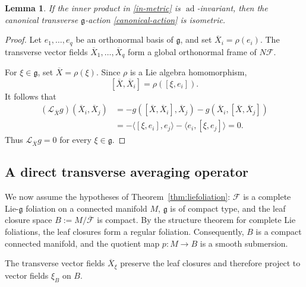\documentclass[reqno, 11pt]{amsart}
\newtheorem{lem}[thm]{Lemma}
\theoremstyle{definition}
\theoremstyle{property}
\theoremstyle{remark}
\numberwithin{equation}{section}
\begin{document}
\begin{lem}\label{isometric-action}
If the inner product in \eqref{in-metric} is
$\operatorname{ad}$-invariant, then the canonical transverse
$\mathfrak g$-action \eqref{canonical-action} is isometric.
\end{lem}

\begin{proof}
Let $e_1,\dots,e_q$ be an orthonormal basis of $\mathfrak g$, and set
$\overline X_i=\rho(e_i)$. The transverse vector fields
$\overline X_1,\dots,\overline X_q$ form a global orthonormal frame of
$N\mathcal F$.

For $\xi\in\mathfrak g$, set $\overline X=\rho(\xi)$. Since
$\rho$ is a Lie algebra homomorphism,
\[
[\overline X,\overline X_i]=\rho([\xi,e_i]).
\]
It follows that
\[
\begin{split}
(\mathcal L_{\overline X}g)(\overline X_i,\overline X_j)
&=
-g([\overline X,\overline X_i],\overline X_j)
-g(\overline X_i,[\overline X,\overline X_j])\\
&=
-\langle[\xi,e_i],e_j\rangle
-\langle e_i,[\xi,e_j]\rangle
=0.
\end{split}
\]
Thus $\mathcal L_{\overline X}g=0$ for every $\xi\in\mathfrak g$.
\end{proof}

\subsection{A direct transverse averaging operator}

We now assume the hypotheses of Theorem~\ref{thm:liefoliation}: $\mathcal F$ is a complete Lie-$\mathfrak g$ foliation on a connected manifold $M$, $\mathfrak g$ is of compact type, and the leaf closure space
$
B:=M/\overline{\mathcal F}$
is compact. By the structure theorem for complete Lie foliations, the leaf
closures form a regular foliation. Consequently, $B$ is a compact connected
manifold, and the quotient map
$
p:M\longrightarrow B$
is a smooth submersion.

The transverse vector fields $\overline X_\xi$ preserve the leaf closures
and therefore project to vector fields $\xi_B$ on $B$.
\end{document}
